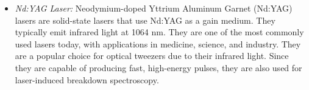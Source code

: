 \documentclass[%
 reprint,
superscriptaddress,
 amsmath,amssymb,
 aps,
prc,
]{revtex4-1}
\begin{document}
\begin{itemize}
\begin{itemize}
		\item \textit{Nd:YAG Laser:} Neodymium-doped Yttrium Aluminum Garnet (Nd:YAG) lasers are solid-state lasers that use Nd:YAG as a gain medium. They typically emit infrared light at 1064 nm. They are one of the most commonly used lasers today, with applications in medicine, science, and industry. They are a popular choice for optical tweezers due to their infrared light. Since they are capable of producing fast, high-energy pulses, they are also used for laser-induced breakdown spectroscopy.
	\end{itemize}
\end{itemize}
\end{document}

